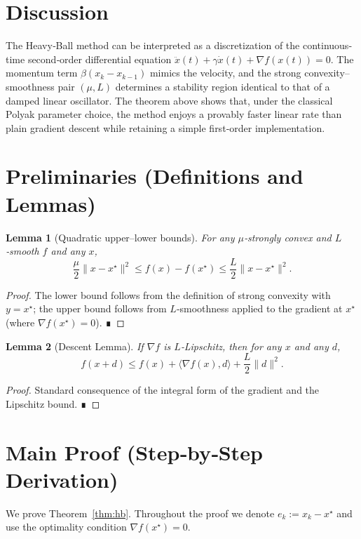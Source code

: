\documentclass{article}
\newtheorem{lemma}{Lemma}
\begin{document}
\section*{Discussion}
The Heavy‑Ball method can be interpreted as a discretization of the
continuous‐time second‑order differential equation
$\ddot{x}(t)+\gamma\dot{x}(t)+\nabla f(x(t))=0$.
The momentum term $\beta(x_k-x_{k-1})$ mimics the velocity,
and the strong convexity–smoothness pair $(\mu,L)$ determines a
stability region identical to that of a damped linear oscillator.
The theorem above shows that, under the classical Polyak
parameter choice, the method enjoys a provably faster linear rate
than plain gradient descent while retaining a simple first‑order
implementation.

\section*{Preliminaries (Definitions and Lemmas)}
\begin{lemma}[Quadratic upper–lower bounds]\label{lem:quad}
For any $\mu$‑strongly convex and $L$‑smooth $f$ and any $x$,
\[
\frac{\mu}{2}\|x-x^\star\|^{2}\le f(x)-f(x^\star)\le
\frac{L}{2}\|x-x^\star\|^{2}.
\]
\end{lemma}
\begin{proof}
The lower bound follows from the definition of strong convexity with
$y=x^\star$; the upper bound follows from $L$‑smoothness applied to the
gradient at $x^\star$ (where $\nabla f(x^\star)=0$). ∎
\end{proof}

\begin{lemma}[Descent Lemma]\label{lem:descent}
If $\nabla f$ is $L$‑Lipschitz, then for any $x$ and any $d$,
\[
f(x+d)\le f(x)+\langle\nabla f(x),d\rangle+\frac{L}{2}\|d\|^{2}.
\]
\end{lemma}
\begin{proof}
Standard consequence of the integral form of the gradient
and the Lipschitz bound. ∎
\end{proof}

\section*{Main Proof (Step‑by‑Step Derivation)}
We prove Theorem~\ref{thm:hb}.  Throughout the proof we denote
$e_k:=x_k-x^\star$ and use the optimality condition
$\nabla f(x^\star)=0$.
\end{document}
